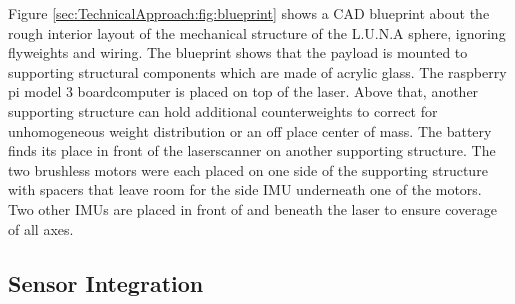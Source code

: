 Figure \ref{sec:TechnicalApproach:fig:blueprint} shows a CAD blueprint about the rough interior layout of the mechanical structure of the L.U.N.A sphere, ignoring flyweights and wiring. The blueprint shows that the payload is mounted to supporting structural components which are made of acrylic glass. The raspberry pi model 3 boardcomputer is placed on top of the laser. Above that, another supporting structure can hold additional counterweights to correct for unhomogeneous weight distribution or an off place center of mass.                                                                                                     
The battery finds its place in front of the laserscanner on another supporting structure. The two brushless motors were each placed on one side of the supporting structure with spacers that leave room for the side IMU underneath one of the motors. Two other IMUs are placed in front of and beneath the laser to ensure coverage of all axes.                                                                                 
                                                                                                                                                                                                                  
\subsection{Sensor Integration}                                                                                                                                                                                   
\label{sec:TechnicalApproach:SensorIntegration}

